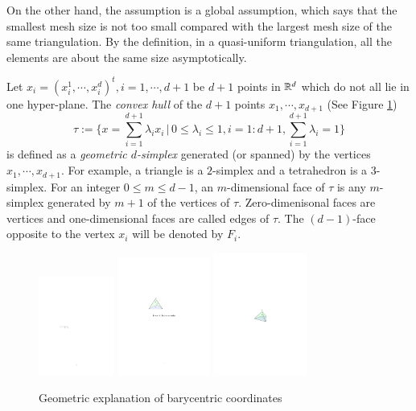 On the other hand, the assumption  is a global assumption,
which says that the smallest mesh size is not too small compared with
the largest mesh size of the same triangulation.  By the definition, in
a quasi-uniform triangulation, all the elements are about the same size
asymptotically.

Let $ x_{i}=(x^1_{i}, \cdots, x^d_{i})^t, i=1,\cdots, d+1$ be $d+1$ points in $\mathbb R^d$ which do not all lie in one hyper-plane. 
The {\it convex hull} of the $d+1$ points $ x_1, \cdots,  x_{d+1}$ (See Figure \ref{fig:barycentricCoor})
\begin{equation}
\tau :=\{ x=\sum _{i=1}^{d+1}\lambda _i x_i \, | \, 0\leq \lambda_i\leq 1, i=1:d+1, \sum _{i=1}^{d+1}\lambda _i=1 \}
\end{equation}
is defined as a {\em geometric $d$-simplex} generated (or spanned) by
the vertices $ x_1, \cdots,  x_{d+1}$. For example, a triangle
is a $2$-simplex and a tetrahedron is a $3$-simplex. For an integer
$0\leq m \leq d-1$, an $m$-dimensional face of $\tau$ is any
$m$-simplex generated by $m+1$ of the vertices of
$\tau$. Zero-dimenisonal faces are vertices and one-dimensional faces
are called edges of $\tau$. The $(d-1)$-face opposite to the vertex
$ x_i$ will be denoted by $F_i$.
\begin{figure}[hpt]
\centering
\includegraphics*[width=2.5cm]{figures/barycentricCoor1D.pdf}
\includegraphics*[width=3cm]{figures/barycentricCoor2D.pdf}
\includegraphics*[width=3.1cm]{figures/barycentricCoor3D.pdf}
\caption{Geometric explanation of barycentric coordinates}
\label{fig:barycentricCoor}
\end{figure}
